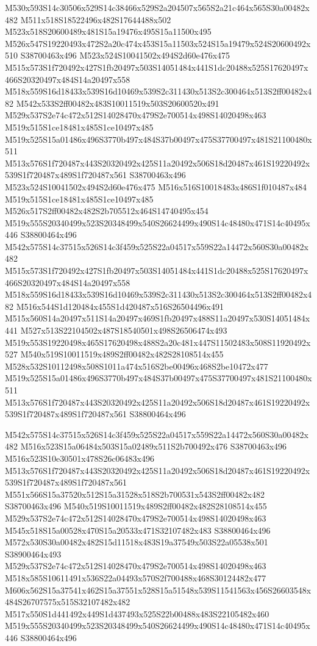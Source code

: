 \documentclass{article}
\begin{document}
\begin{multicols}{2}
M530x593S14c30506x529S14c38466x529S2a204507x565S2a21c464x565S30a00482x482 M511x518S18522496x482S17644488x502 M523x518S20600489x481S15a19476x495S15a11500x495 M526x547S19220493x472S2a20c474x453S15a11503x524S15a19479x524S20600492x510 S38700463x496 M523x524S10041502x494S2d60e476x475 M515x573S1f720492x427S1fb20497x503S14051484x441S1dc20488x525S17620497x466S20320497x484S14a20497x558 M518x559S16d18433x539S16d10469x539S2c311430x513S2c300464x513S2ff00482x482 M542x533S2ff00482x483S10011519x503S20600520x491 M529x537S2e74c472x512S14028470x479S2e700514x498S14020498x463 M519x515S1ce18481x485S1ce10497x485 M519x525S15a01486x496S3770b497x484S37b00497x475S37700497x481S21100480x511 M513x576S1f720487x443S20320492x425S11a20492x506S18d20487x461S19220492x539S1f720487x489S1f720487x561 S38700463x496 M523x524S10041502x494S2d60e476x475 M516x516S10018483x486S1f010487x484 M519x515S1ce18481x485S1ce10497x485 M526x517S2ff00482x482S2b705512x464S14740495x454 M519x555S20340499x523S20348499x540S26624499x490S14c48480x471S14c40495x446 S38800464x496 M542x575S14c37515x526S14c3f459x525S22a04517x559S22a14472x560S30a00482x482 M515x573S1f720492x427S1fb20497x503S14051484x441S1dc20488x525S17620497x466S20320497x484S14a20497x558 M518x559S16d18433x539S16d10469x539S2c311430x513S2c300464x513S2ff00482x482 M516x544S1d120484x455S1d420487x516S26504496x491 M515x560S14a20497x511S14a20497x469S1fb20497x488S11a20497x530S14051484x441 M527x513S22104502x487S18540501x498S26506474x493 M519x553S19220498x465S17620498x488S2a20c481x447S11502483x508S11920492x527 M540x519S10011519x489S2ff00482x482S28108514x455 M528x532S10112498x508S1011a474x516S2be00496x468S2be10472x477 M519x525S15a01486x496S3770b497x484S37b00497x475S37700497x481S21100480x511 M513x576S1f720487x443S20320492x425S11a20492x506S18d20487x461S19220492x539S1f720487x489S1f720487x561 S38800464x496

M542x575S14c37515x526S14c3f459x525S22a04517x559S22a14472x560S30a00482x482 M516x523S15a06484x503S15a02489x511S2b700492x476 S38700463x496 M516x523S10e30501x478S26c06483x496 M513x576S1f720487x443S20320492x425S11a20492x506S18d20487x461S19220492x539S1f720487x489S1f720487x561 M551x566S15a37520x512S15a31528x518S2b700531x543S2ff00482x482 S38700463x496 M540x519S10011519x489S2ff00482x482S28108514x455 M529x537S2e74c472x512S14028470x479S2e700514x498S14020498x463 M545x518S15a00528x470S15a20533x471S32107482x483 S38800464x496 M572x530S30a00482x482S15d11518x483S19a37549x503S22a05538x501 S38900464x493 M529x537S2e74c472x512S14028470x479S2e700514x498S14020498x463 M518x585S10611491x536S22a04493x570S2f700488x468S30124482x477 M606x562S15a37541x462S15a37551x528S15a51548x539S11541563x456S26603548x484S26707575x515S32107482x482 M517x550S1d441492x449S1d437493x525S22b00488x483S22105482x460 M519x555S20340499x523S20348499x540S26624499x490S14c48480x471S14c40495x446 S38800464x496


\end{multicols}
\end{document}
